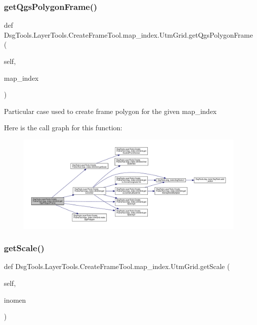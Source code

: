 \subsubsection{\texorpdfstring{get\+Qgs\+Polygon\+Frame()}{getQgsPolygonFrame()}}
{\footnotesize\ttfamily def Dsg\+Tools.\+Layer\+Tools.\+Create\+Frame\+Tool.\+map\+\_\+index.\+Utm\+Grid.\+get\+Qgs\+Polygon\+Frame (\begin{DoxyParamCaption}\item[{}]{self,  }\item[{}]{map\+\_\+index }\end{DoxyParamCaption})}

\begin{DoxyVerb}Particular case used to create frame polygon for the given
map_index
\end{DoxyVerb}
 Here is the call graph for this function\+:
\nopagebreak
\begin{figure}[H]
\begin{center}
\leavevmode
\includegraphics[width=350pt]{class_dsg_tools_1_1_layer_tools_1_1_create_frame_tool_1_1map__index_1_1_utm_grid_a966bc1ef179c687e96a4cd4cca9b20c1_cgraph}
\end{center}
\end{figure}
\mbox{\label{class_dsg_tools_1_1_layer_tools_1_1_create_frame_tool_1_1map__index_1_1_utm_grid_a5526730674c00c9312d8c4278ed06c75}} 
\subsubsection{\texorpdfstring{get\+Scale()}{getScale()}}
{\footnotesize\ttfamily def Dsg\+Tools.\+Layer\+Tools.\+Create\+Frame\+Tool.\+map\+\_\+index.\+Utm\+Grid.\+get\+Scale (\begin{DoxyParamCaption}\item[{}]{self,  }\item[{}]{inomen }\end{DoxyParamCaption})}

